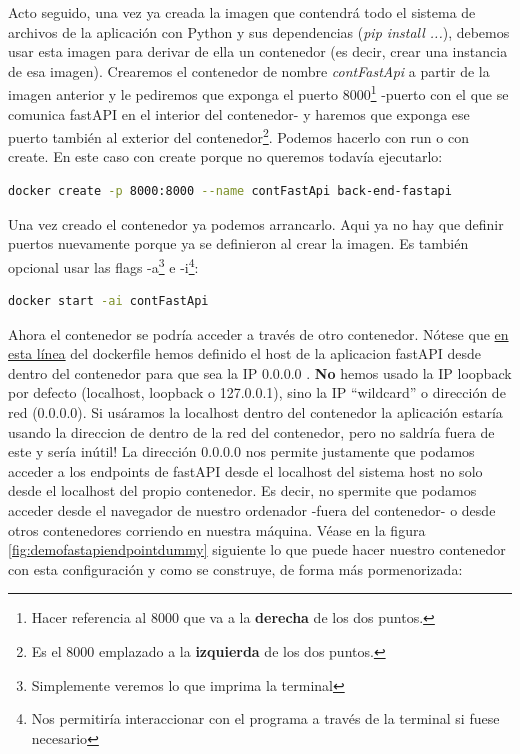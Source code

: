 \documentclass[a4paper,12pt]{report}
\begin{document}
	
	Acto seguido, una vez ya creada la imagen que contendrá todo el sistema de archivos de la aplicación con Python y sus dependencias (\textit{pip install ...}), debemos usar esta imagen para derivar de ella un contenedor (es decir, crear una instancia de esa imagen). Crearemos el contenedor de nombre \textit{contFastApi} a partir de la imagen anterior y le pediremos que exponga el puerto 8000\footnote{Hacer referencia al 8000 que va a la \textbf{derecha} de los dos puntos.} -puerto con el que se comunica fastAPI en el interior del contenedor- y haremos que exponga ese puerto también al exterior del contenedor\footnote{Es el 8000 emplazado a la \textbf{izquierda} de los dos puntos.}. Podemos hacerlo con run o con create. En este caso con create porque no queremos todavía ejecutarlo:
	
	\begin{lstlisting}[language=bash]
docker create -p 8000:8000 --name contFastApi back-end-fastapi
	\end{lstlisting}

	
	Una vez creado el contenedor ya podemos arrancarlo. Aqui ya no hay que definir puertos nuevamente porque ya se definieron al crear la imagen. Es también opcional usar las flags -a\footnote{Simplemente veremos lo que imprima la terminal} e -i\footnote{Nos permitiría interaccionar con el programa a través de la terminal si fuese necesario}:
	
	\begin{lstlisting}[language=bash]
		docker start -ai contFastApi
	\end{lstlisting}
	
	
	Ahora el contenedor se podría acceder a través de otro contenedor. Nótese que  \href{https://github.com/blackcub3s/mercApp/blob/cf678ebf99ce636b64c70c8faa239658a601550d/APP%20WEB/__FastAPI__/Dockerfile#L22}{en esta línea} del dockerfile hemos definido el host de la aplicacion fastAPI desde dentro del contenedor para que sea la IP 0.0.0.0 . \textbf{No }hemos usado la IP loopback por defecto (localhost, loopback o 127.0.0.1), sino la IP ``wildcard'' o dirección de red (0.0.0.0). Si usáramos la localhost dentro del contenedor la aplicación estaría usando la direccion de dentro de la red del contenedor, pero no saldría fuera de este y sería inútil! La dirección 0.0.0.0 nos permite justamente que podamos acceder a los endpoints de fastAPI desde el localhost del sistema host no solo desde el localhost del propio contenedor. Es decir, no spermite que podamos acceder desde el navegador de nuestro ordenador -fuera del contenedor- o desde otros contenedores corriendo en nuestra máquina. Véase en la figura \ref{fig:demofastapiendpointdummy} siguiente lo que puede hacer nuestro contenedor con esta configuración y como se construye, de forma más pormenorizada:
	
\end{document}
